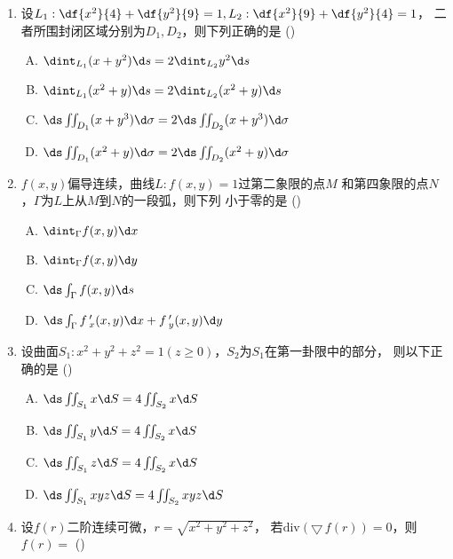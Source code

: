 \begin{enumerate}
  (A)$-\df32\pi$\hspace{1cm}(B)$0$\hspace{1cm}
  (C)$\df{\pi}2$\hspace{1cm}(D)$\df32\pi$
  \item 设$L_1:\df{x^2}{4}+\df{y^2}{9}=1,L_2:\df{x^2}{9}+\df{y^2}{4}=1$，
  二者所围封闭区域分别为$D_1,D_2$，则下列正确的是
  (\underline{\hspace{1cm}})
  \begin{enumerate}[(A)]
    \item $\dint_{L_1}(x+y^2)\d s=2\dint_{L_2}y^2\d s$
    \item $\dint_{L_1}(x^2+y)\d s=2\dint_{L_2}(x^2+y)\d s$
    \item $\ds\iint_{D_1}(x+y^3)\d\sigma=2\ds\iint_{D_2}(x+y^3)\d\sigma$
    \item $\ds\iint_{D_1}(x^2+y)\d\sigma=2\ds\iint_{D_2}(x^2+y)\d\sigma$
  \end{enumerate}
  \item $f(x,y)$偏导连续，曲线$L:f(x,y)=1$过第二象限的点$M$
  和第四象限的点$N$，$\Gamma$为$L$上从$M$到$N$的一段弧，则下列
  小于零的是
  (\underline{\hspace{1cm}})
  \begin{enumerate}[(A)]
    \item $\dint_{\Gamma}f(x,y)\d x$
    \item $\dint_{\Gamma}f(x,y)\d y$
    \item $\ds\int_{\Gamma}f(x,y)\d s$
    \item $\ds\int_{\Gamma}f\,'_x(x,y)\d x+f\,'_y(x,y)\d y$
  \end{enumerate}
  \item 设曲面$S_1:x^2+y^2+z^2=1(z\geq
  0)$，$S_2$为$S_1$在第一卦限中的部分，
  则以下正确的是
  (\underline{\hspace{1cm}})
  \begin{enumerate}[(A)]
    \item $\ds\iint_{S_1}x\d S=4\iint_{S_2}x\d S$
    \item $\ds\iint_{S_1}y\d S=4\iint_{S_2}x\d S$
    \item $\ds\iint_{S_1}z\d S=4\iint_{S_2}x\d S$
    \item $\ds\iint_{S_1}xyz\d S=4\iint_{S_2}xyz\d S$
  \end{enumerate}
  \item 设$f(r)$二阶连续可微，$r=\sqrt{x^2+y^2+z^2}$，
  若$\mathrm{div}(\bigtriangledown\,f(r))=0$，则$f(r)=$
  (\underline{\hspace{1cm}})
  

\end{enumerate}
